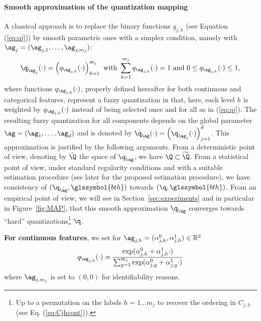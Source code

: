\paragraph{Smooth approximation of the quantization mapping}

A classical approach is to replace the binary functions $q_{j,h}$ (see Equation (\ref{eq:qj}))  by smooth parametric ones  with a simplex condition, namely with $\ag_j=(\ag_{j,1},\ldots, \ag_{j,m_j})$:
\begin{equation*}
    {\q_{\ag_j}(\cdot)=\left(q_{\ag_{j,h}}(\cdot)\right)_{h=1}^{m_j} \text{ with } \sum_{h=1}^{m_j}q_{\ag_{j,h}}(\cdot)=1 \text{ and } 0 \leq q_{\ag_{j,h}}(\cdot) \leq 1,}
\end{equation*}
where functions $q_{\ag_{j,h}}(\cdot)$, properly defined hereafter for both continuous and categorical features, represent a fuzzy quantization in that, here, each level $h$ is weighted by $q_{\ag_{j,h}}(\cdot)$ instead of being selected once and for all as in (\ref{eq:qj}). The resulting fuzzy quantization for all components depends on the global parameter $\ag = (\ag_1, \ldots, \ag_d)$ and is denoted by $\q_{\ag}(\cdot)=\left(\q_{\ag_j}(\cdot)\right)_{j=1}^d$. This approximation is justified by the following arguments. From a deterministic point of view, denoting by $\tilde{\Q}$ the space of $\q_{\ag}$, we have $\Q \subset \widetilde{\Q}$. From a statistical point of view, under standard regularity conditions and with a suitable estimation procedure (see later for the proposed estimation procedure), we have consistency of $(\q_{\hat{\ag}}, \hat{\glssymbol{bth}})$ towards $(\q,\glssymbol{bth})$. From an empirical point of view, we will see in Section~\ref{sec:experiments} and in particular in Figure~\ref{fig:MAP}, that this smooth approximation $\q_{\ag}$ converges towards ``hard'' quantizations\footnote{Up to a permutation on the labels $h=1 \ldots m_j$ to recover the ordering in $C_{j,h}$ (see Eq. (\ref{eq:Cjhcont})).} $\q$.



 {\bf For continuous features}, we set for $\ag_{j,h} = (\alpha^0_{j,h},\alpha^1_{j,h}) \in \mathbb{R}^2$
\begin{equation} \label{eq:softmax}
q_{\ag_{j,h}}(\cdot) = \frac{\exp(\alpha^0_{j,h} + \alpha^1_{j,h}  \cdot)}{\sum_{g=1}^{m_j} \exp(\alpha^0_{j,g} + \alpha^1_{j,g}  \cdot)}
\end{equation}
where $\ag_{j,m_j}$ is set to $(0,0)$ for identifiability reasons.




